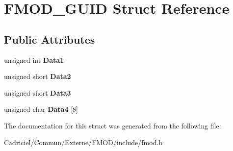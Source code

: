 \hypertarget{struct_f_m_o_d___g_u_i_d}{}\section{F\+M\+O\+D\+\_\+\+G\+U\+ID Struct Reference}
\label{struct_f_m_o_d___g_u_i_d}
\subsection*{Public Attributes}
\begin{DoxyCompactItemize}
\item 
unsigned int {\bfseries Data1}\hypertarget{struct_f_m_o_d___g_u_i_d_ade5cc5a3c9665147a488c8a9e2ea211c}{}\label{struct_f_m_o_d___g_u_i_d_ade5cc5a3c9665147a488c8a9e2ea211c}

\item 
unsigned short {\bfseries Data2}\hypertarget{struct_f_m_o_d___g_u_i_d_ac5805cdbaf5cfa2113d637e11f6ad36e}{}\label{struct_f_m_o_d___g_u_i_d_ac5805cdbaf5cfa2113d637e11f6ad36e}

\item 
unsigned short {\bfseries Data3}\hypertarget{struct_f_m_o_d___g_u_i_d_a98f6f2f06cad235236cbc86099aa4e96}{}\label{struct_f_m_o_d___g_u_i_d_a98f6f2f06cad235236cbc86099aa4e96}

\item 
unsigned char {\bfseries Data4} \mbox{[}8\mbox{]}\hypertarget{struct_f_m_o_d___g_u_i_d_a3a1337ea3f0bec8fbddd197ebdb29cf7}{}\label{struct_f_m_o_d___g_u_i_d_a3a1337ea3f0bec8fbddd197ebdb29cf7}

\end{DoxyCompactItemize}


The documentation for this struct was generated from the following file\+:\begin{DoxyCompactItemize}
\item 
Cadriciel/\+Commun/\+Externe/\+F\+M\+O\+D/include/fmod.\+h\end{DoxyCompactItemize}
